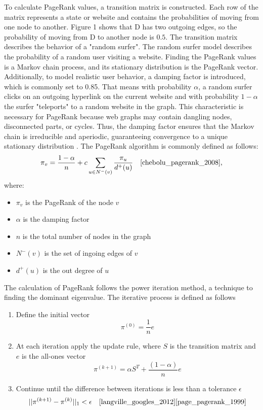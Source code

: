 To calculate PageRank values, a transition matrix is constructed. Each row of the matrix represents a state or website and contains the probabilities of moving from one node to another. Figure 1 shows that D has two outgoing edges, so the probability of moving from D to another node is $0.5$. The transition matrix describes the behavior of a "random surfer". The random surfer model describes the probability of a random user visiting a website. Finding the PageRank values is a Markov chain process, and its stationary distribution is the PageRank vector. Additionally, to model realistic user behavior, a damping factor is introduced, which is commonly set to 0.85. That means with probability $\alpha$, a random surfer clicks on an outgoing hyperlink on the current website and with probability $1-\alpha$ the surfer "teleports" to a random website in the graph. This characteristic is necessary for PageRank because web graphs may contain dangling nodes, disconnected parts, or cycles. Thus, the damping factor ensures that the Markov chain is irreducible and aperiodic, guaranteeing convergence to a unique stationary distribution \cite{langville_googles_2012}. 
The PageRank algorithm is commonly defined as follows:
\begin{equation}
    \pi_v = \frac{1-\alpha}{n}+c\sum_{u\in N^-(v)}\frac{\pi_u}{d^+(u)} \quad\text{\cite{chebolu_pagerank_2008},}
\end{equation} 
where: 
\begin{itemize}
    \item $\pi_v$ is the PageRank of the node $v$
    \item $\alpha$ is the damping factor
    \item $n$ is the total number of nodes in the graph
    \item $N^-(v)$ is the set of ingoing edges of $v$
    \item $d^+(u)$ is the out degree of $u$
\end{itemize} 
The calculation of PageRank follows the power iteration method, a technique to finding the dominant eigenvalue. The iterative process is defined as follows
\begin{enumerate}
    \item Define the initial vector 
    \begin{equation}
        \pi^{(0)}=\frac{1}{n}e
    \end{equation}
    \item At each iteration apply the update rule, where $S$ is the transition matrix and $e$ is the all-ones vector
    \begin{equation}
        \pi^{(k+1)} = \alpha S^T+ \frac{(1-\alpha)}{n}e
    \end{equation}
    \item Continue until the difference between iterations is less than a tolerance $\epsilon$
    \begin{equation}
        ||\pi^{(k+1)}-\pi^{(k)}||_1<\epsilon \quad \text{\cite{langville_googles_2012}\cite{page_pagerank_1999}}
    \end{equation}
    
\end{enumerate}
